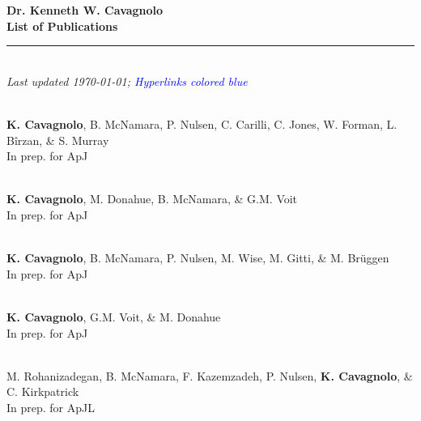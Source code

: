 \documentclass[12pt]{cv}
\begin{document}
\begin{center}
{\large \textbf{Dr. Kenneth W. Cavagnolo\\List of Publications}}\\
\rule{17.35cm}{2pt}\\
\footnotesize
{\it Last updated \today; \textcolor{blue}{Hyperlinks colored blue}}
\normalsize
\end{center}

\begin{llist}



{}\\
{\bf K. Cavagnolo}, B. McNamara, P. Nulsen, C. Carilli, C. Jones, W. Forman,
L. B\^irzan, \& S. Murray\\
In prep. for ApJ

{}\\
{\bf K. Cavagnolo}, M. Donahue, B. McNamara, \& G.M. Voit\\
In prep. for ApJ

{}\\
{\bf K. Cavagnolo}, B. McNamara, P. Nulsen, M. Wise, M. Gitti, \& M. Br\"uggen\\
In prep. for ApJ

{}\\
{\bf K. Cavagnolo}, G.M. Voit, \& M. Donahue\\
In prep. for ApJ

{}\\
M. Rohanizadegan, B. McNamara, F. Kazemzadeh, P. Nulsen, {\bf K. Cavagnolo}, \& C. Kirkpatrick\\
In prep. for ApJL




\end{llist}
\end{document}
